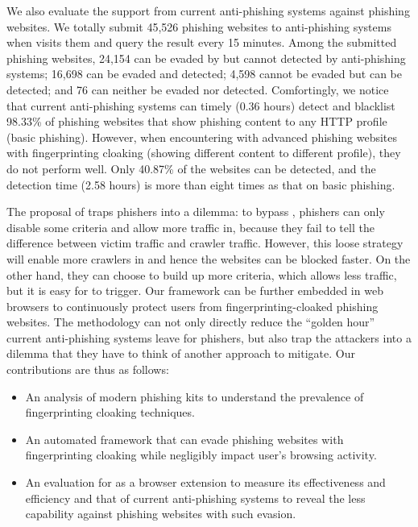 We also evaluate the support from current anti-phishing systems against phishing websites.
We totally submit 45,526 phishing websites to anti-phishing systems when \spartacus visits them and query the result every 15 minutes.
Among the submitted phishing websites, 24,154 can be evaded by \spartacus but cannot detected by anti-phishing systems;
16,698 can be evaded and detected;
4,598 cannot be evaded but can be detected;
and 76 can neither be evaded nor detected.
Comfortingly, we notice that current anti-phishing systems can timely (0.36 hours) detect and blacklist 98.33\% of phishing websites that show phishing content to any HTTP profile (basic phishing).
However, when encountering with advanced phishing websites with fingerprinting cloaking (showing different content to different profile), they do not perform well.
Only 40.87\% of the websites can be detected, and the detection time (2.58 hours) is more than eight times as that on basic phishing.

The proposal of \spartacus traps phishers into a dilemma:
to bypass \spartacus, phishers can only disable some criteria and allow more traffic in, because they fail to tell the difference between victim traffic and crawler traffic.
However, this loose strategy will enable more crawlers in and hence the websites can be blocked faster.
On the other hand, they can choose to build up more criteria, which allows less traffic, but it is easy for \spartacus to trigger.
Our \spartacus framework can be further embedded in web browsers to continuously protect users from fingerprinting-cloaked phishing websites.
The methodology can not only directly reduce the ``golden hour'' current anti-phishing systems leave for phishers,
but also trap the attackers into a dilemma that they have to think of another approach to mitigate.
Our contributions are thus as follows:

\begin{itemize}
    \item An analysis of modern phishing kits to understand the prevalence of fingerprinting cloaking techniques.
    \item An automated framework that can evade phishing websites with fingerprinting cloaking while negligibly impact user's browsing activity.
    \item An evaluation for \spartacus as a browser extension to measure its effectiveness and efficiency and that of current anti-phishing systems to reveal the less capability against phishing websites with such evasion.
\end{itemize}
